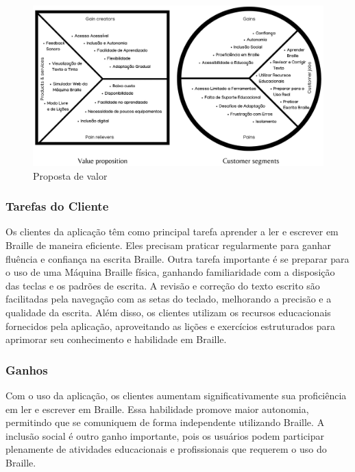 \begin{figure}[h]
    \centering
    \includegraphics[scale=0.15]{ch03/assets/value-proposition.jpg}
    \decoRule
    \caption[Proposta de valor]{Proposta de valor}
    \label{fig:ch02-longitudinal-perspective}
\end{figure}

\subsubsection{Tarefas do Cliente}

Os clientes da aplicação têm como principal tarefa aprender a ler e escrever em Braille de maneira eficiente. Eles precisam praticar regularmente para ganhar fluência e confiança na escrita Braille. Outra tarefa importante é se preparar para o uso de uma Máquina Braille física, ganhando familiaridade com a disposição das teclas e os padrões de escrita. A revisão e correção do texto escrito são facilitadas pela navegação com as setas do teclado, melhorando a precisão e a qualidade da escrita. Além disso, os clientes utilizam os recursos educacionais fornecidos pela aplicação, aproveitando as lições e exercícios estruturados para aprimorar seu conhecimento e habilidade em Braille.

\subsubsection{Ganhos}

Com o uso da aplicação, os clientes aumentam significativamente sua proficiência em ler e escrever em Braille. Essa habilidade promove maior autonomia, permitindo que se comuniquem de forma independente utilizando Braille. A inclusão social é outro ganho importante, pois os usuários podem participar plenamente de atividades educacionais e profissionais que requerem o uso do Braille. 

